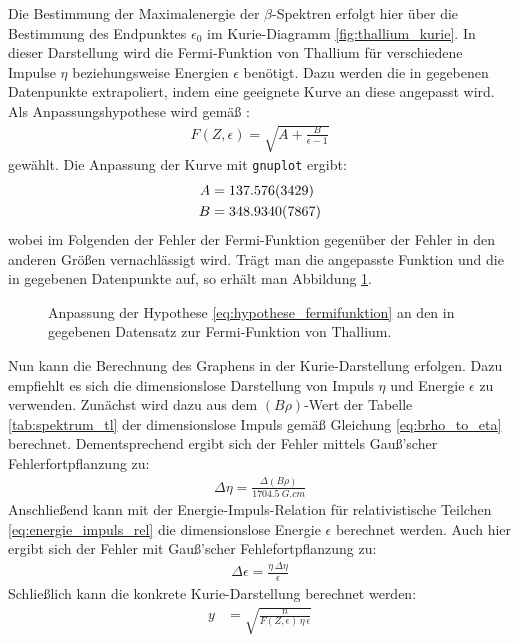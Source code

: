 \documentclass[11pt, a4paper]{article}
\numberwithin{equation}{section}
\begin{document}
Die Bestimmung der Maximalenergie der $\beta$-Spektren erfolgt hier über die Bestimmung des Endpunktes $\epsilon_0$ im Kurie-Diagramm \ref{fig:thallium_kurie}.
In dieser Darstellung wird die Fermi-Funktion von Thallium für verschiedene Impulse $\eta$ beziehungsweise Energien $\epsilon$ benötigt.
Dazu werden die in \cite{anleitung} gegebenen Datenpunkte extrapoliert, indem eine geeignete Kurve an diese angepasst wird.
Als Anpassungshypothese wird gemäß \cite{fermi_function}:
\begin{align}
	F(Z, \epsilon) = \sqrt{A + \frac{B}{\epsilon - 1}}
	\label{eq:hypothese_fermifunktion}
\end{align}
gewählt.
Die Anpassung der Kurve mit \texttt{gnuplot} ergibt:
\begin{align*}
	A &= \num{137.576 +- 3.429} \\
	B &= \num{348.934 +- 0.7867}
\end{align*}
wobei im Folgenden der Fehler der Fermi-Funktion gegenüber der Fehler in den anderen Größen vernachlässigt wird.
Trägt man die angepasste Funktion und die in \cite{anleitung} gegebenen Datenpunkte auf, so erhält man Abbildung \ref{fig:fermi_tl}.
\begin{figure}[h]
	\centering
	
	\caption{Anpassung der Hypothese \eqref{eq:hypothese_fermifunktion} an den in \cite{anleitung} gegebenen Datensatz zur Fermi-Funktion von Thallium.}
	\label{fig:fermi_tl}
\end{figure}
Nun kann die Berechnung des Graphens in der Kurie-Darstellung erfolgen.
Dazu empfiehlt es sich die dimensionslose Darstellung von Impuls $\eta$ und Energie $\epsilon$ zu verwenden.
Zunächst wird dazu aus dem $(B \rho)$-Wert der Tabelle \ref{tab:spektrum_tl} der dimensionslose Impuls gemäß Gleichung \eqref{eq:brho_to_eta} berechnet.
Dementsprechend ergibt sich der Fehler mittels Gauß'scher Fehlerfortpflanzung zu:
\begin{align*}
	\Delta \eta = \frac{\Delta (B \rho)}{\SI{1704.5}{G.cm}}
\end{align*}
Anschließend kann mit der Energie-Impuls-Relation für relativistische Teilchen \eqref{eq:energie_impuls_rel} die dimensionslose Energie $\epsilon$ berechnet werden.
Auch hier ergibt sich der Fehler mit Gauß'scher Fehlefortpflanzung zu:
\begin{align*}
	\Delta \epsilon = \frac{\eta \, \Delta \eta}{\epsilon}
\end{align*}
Schließlich kann die konkrete Kurie-Darstellung berechnet werden:
\begin{align}
	y &= \sqrt{\frac{n}{F(Z,\epsilon) \, \eta \, \epsilon}}
	\label{eq:kurie_y}
\end{align}
\end{document}
